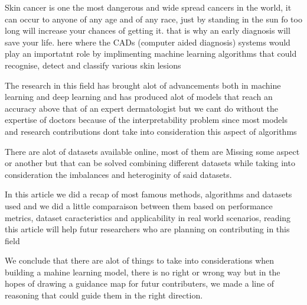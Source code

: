    Skin cancer is one the most dangerous and wide spread cancers in the world, it can occur to anyone of any age and of any race, just by standing in the sun fo too long will increase your chances of getting it. that is why an early diagnosis will save your life. here where the CADs (computer aided diagnosis) systems would play an importatnt role by implimenting machine learning algorithms that could recognise, detect and classify various skin lesions 

    The research in this field has brought alot of advancements both in machine learning and deep learning and has produced alot of models that reach an accuracy above that of an expert dermatologist but we cant do without the expertise of doctors because of the interpretability problem since most models and research contributions dont take into consideration this aspect of algorithms

    There are alot of datasets available online, most of them are Missing some aspect or another but that can be solved combining different datasets while taking into consideration the imbalances and heteroginity of said datasets.

    In this article we did a recap of most famous methods, algorithms and datasets used and we did a little comparaison between them based on performance metrics, dataset caracteristics and applicability in real world scenarios, reading this article will help futur researchers who are planning on contributing in this field  
    
    We conclude that there are alot of things to take into considerations when building a mahine learning model, there is no right or wrong way but in the hopes of drawing a guidance map for futur contributers, we made a line of reasoning that could guide them in the right direction. 




